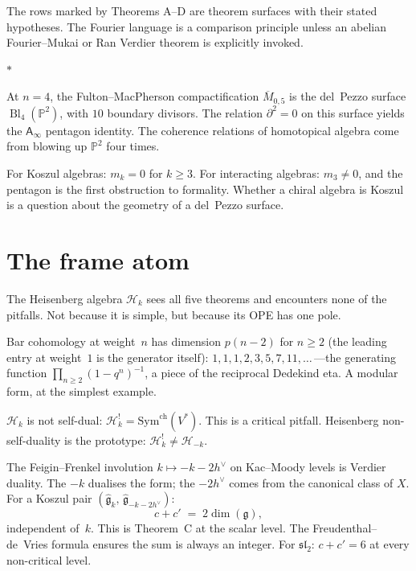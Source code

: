 \documentclass[11pt]{article}
\newcommand{\cH}{\mathcal{H}}
\newcommand{\fg}{\mathfrak{g}}
\newcommand{\fsl}{\mathfrak{sl}}
\newcommand{\bP}{\mathbb{P}}
\newcommand{\Ainf}{\mathsf{A}_{\infty}}
\DeclareMathOperator{\Bl}{Bl}
\newcommand{\sep}{\bigskip\begin{center}$*$\end{center}\medskip}
\begin{document}
The rows marked by Theorems A--D are theorem surfaces with their
stated hypotheses.  The Fourier language is a comparison
principle unless an abelian Fourier--Mukai or Ran Verdier theorem
is explicitly invoked.

\sep

At $n = 4$, the Fulton--MacPherson compactification
$\overline{M}_{0,5}$ is the del~Pezzo surface $\Bl_4(\bP^2)$,
with $10$ boundary divisors.  The relation $\partial^2 = 0$ on
this surface yields the $\Ainf$ pentagon identity.  The
coherence relations of homotopical algebra come from blowing up
$\bP^2$ four times.

For Koszul algebras: $m_k = 0$ for $k \geq 3$.  For interacting
algebras: $m_3 \neq 0$, and the pentagon is the first obstruction
to formality.  Whether a chiral algebra is Koszul is a question
about the geometry of a del~Pezzo surface.


\section{The frame atom}
\label{sec:frame}

The Heisenberg algebra $\cH_k$ sees all five theorems and
encounters none of the pitfalls.  Not because it is simple,
but because its OPE has one pole.

Bar cohomology at weight~$n$ has dimension $p(n-2)$ for $n \ge 2$
(the leading entry at weight~$1$ is the generator itself):
$1, 1, 1, 2, 3, 5, 7, 11, \ldots$\,---the generating function
$\prod_{n \geq 2}(1-q^n)^{-1}$, a piece of the reciprocal
Dedekind eta.  A modular form, at the simplest example.

$\cH_k$ is not self-dual: $\cH_k^! = \mathrm{Sym}^{\mathrm{ch}}(V^*)$.
This is a critical pitfall.  Heisenberg non-self-duality
is the prototype: $\cH_k^! \neq \cH_{-k}$.

The Feigin--Frenkel involution $k \mapsto -k - 2h^\vee$ on
Kac--Moody levels is Verdier duality.  The $-k$ dualises the
form; the $-2h^\vee$ comes from the canonical class of $X$.
For a Koszul pair
$(\widehat{\fg}_k,\,\widehat{\fg}_{-k-2h^\vee})$:
\begin{equation}\label{eq:central-charge-sum}
c + c' \;=\; 2\dim(\fg),
\end{equation}
independent of~$k$.  This is Theorem~C at the scalar level.
The Freudenthal--de~Vries formula ensures the sum is always
an integer.  For $\fsl_2$: $c + c' = 6$ at every non-critical
level.
\end{document}
